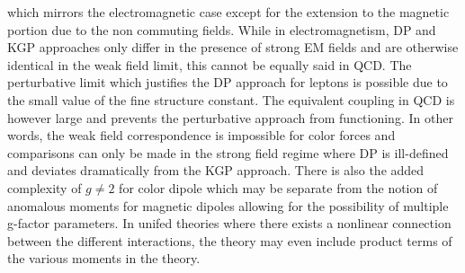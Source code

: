 which mirrors the electromagnetic case except for the extension to the magnetic portion due to the non commuting fields. While in electromagnetism, DP and KGP approaches only differ in the presence of strong EM fields and are otherwise identical in the weak field limit, this cannot be equally said in QCD. The perturbative limit which justifies the DP approach for leptons is possible due to the small value of the fine structure constant. The equivalent coupling in QCD is however large and prevents the perturbative approach from functioning. In other words, the weak field correspondence is impossible for color forces and comparisons can only be made in the strong field regime where DP is ill-defined and deviates dramatically from the KGP approach. There is also the added complexity of $g\neq2$ for color dipole which may be separate from the notion of anomalous moments for magnetic dipoles allowing for the possibility of multiple g-factor parameters. In unifed theories where there exists a nonlinear connection between the different interactions, the theory may even include product terms of the various moments in the theory.

